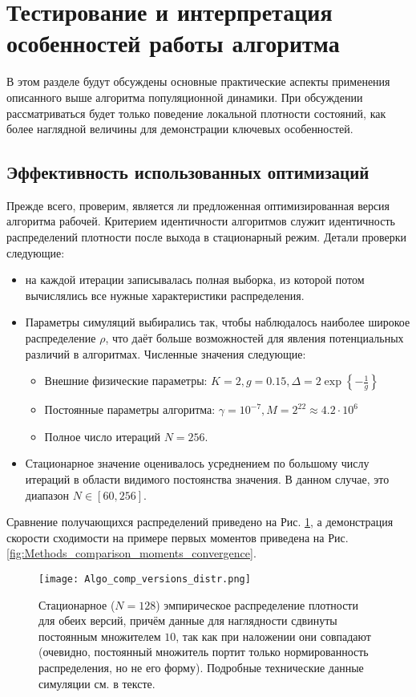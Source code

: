 \section{Тестирование и интерпретация особенностей работы алгоритма}
В этом разделе будут обсуждены основные практические аспекты применения описанного выше алгоритма популяционной динамики. При обсуждении рассматриваться будет только поведение локальной плотности состояний, как более наглядной величины для демонстрации ключевых особенностей.

\subsection{Эффективность использованных оптимизаций}
Прежде всего, проверим, является ли предложенная оптимизированная версия алгоритма рабочей. Критерием идентичности алгоритмов служит идентичность распределений плотности после выхода в стационарный режим. Детали проверки следующие:
\begin{itemize}
	\item на каждой итерации записывалась полная выборка, из которой потом вычислялись все нужные характеристики распределения.
	\item Параметры симуляций выбирались так, чтобы наблюдалось наиболее широкое распределение $\rho$, что даёт больше возможностей для явления потенциальных различий в алгоритмах. Численные значения следующие:
		\begin{itemize}
			\item Внешние физические параметры: $ K = 2, g = 0.15, \Delta = 2\exp \left\{ - \frac{1}{g} \right\}$
			\item Постоянные параметры алгоритма: $ \gamma = 10^{-7}, M = 2^{22} \approx 4.2 \cdot 10^6$
			\item Полное число итераций $N = 256$.
		\end{itemize}
	\item Стационарное значение оценивалось усреднением по большому числу итераций в области видимого постоянства значения. В данном случае, это диапазон  $N \in [60, 256]$.
\end{itemize}
Сравнение получающихся распределений приведено на Рис. \ref{fig:Methods_comparison_stationary_distribtution}, а демонстрация скорости сходимости на примере первых моментов приведена на Рис. \ref{fig:Methods_comparison_moments_convergence}.
\begin{figure}[h]
	\label{fig:Methods_comparison_stationary_distribtution}
	\centering
	\texttt{[image: Algo\_comp\_versions\_distr.png]}
	\caption{Стационарное ($N = 128$) эмпирическое распределение плотности для обеих версий, причём данные для наглядности сдвинуты постоянным множителем $10$, так как при наложении они совпадают (очевидно, постоянный множитель портит только нормированность распределения, но не его форму). Подробные технические данные симуляции см. в тексте.}
\end{figure}

